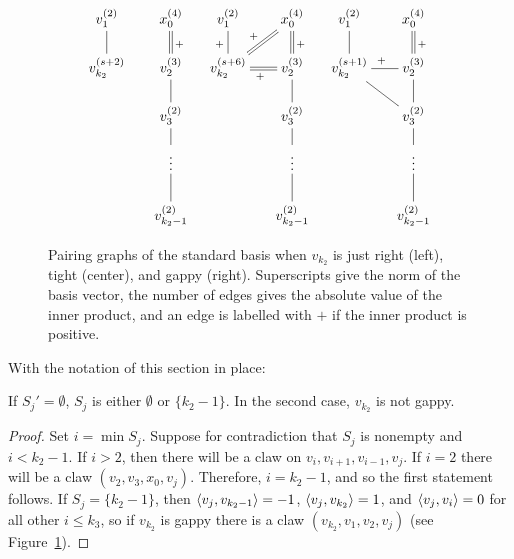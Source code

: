 \begin{figure}[t]
\centering
\begin{align*}
\xymatrix@R1.5em@C1.5em{
v_1^{(2)} \ar@{-}[d] & x_0^{(4)} \ar@{=}[d]^+ \\
v_{k_2}^{(s+2)} & v_2^{(3)} \ar@{-}[d] \\
 & v_{3}^{(2)} \ar@{-}[d] \\
 & \vdots \ar@{-}[d] \\
 & v_{k_2 - 1}^{(2)}
}
&&
\xymatrix@R1.5em@C1.5em{
v_1^{(2)} \ar@{-}[d]_+ & x_0^{(4)} \ar@{=}[d]^+ \ar@{=}[dl]_+\\
v_{k_2}^{(s+6)} \ar@{=}[r]_+ & v_2^{(3)} \ar@{-}[d] \\
 & v_{3}^{(2)} \ar@{-}[d] \\
 & \vdots \ar@{-}[d] \\
 & v_{k_2 - 1}^{(2)}
}
&&
\xymatrix@R1.5em@C1.5em{
v_1^{(2)} \ar@{-}[d] & x_0^{(4)} \ar@{=}[d]^+ \\
v_{k_2}^{(s+1)} \ar@{-}[r]^+ \ar@{-}[dr] & v_2^{(3)} \ar@{-}[d] \\
 & v_{3}^{(2)} \ar@{-}[d] \\
 & \vdots \ar@{-}[d] \\
 & v_{k_2 - 1}^{(2)}
}
\end{align*}
\caption{Pairing graphs of the standard basis when $v_{k_2}$ is just right (left), tight (center), and gappy (right). Superscripts give the norm of the basis vector, the number of edges gives the absolute value of the inner product, and an edge is labelled with $+$ if the inner product is positive. }\label{pairinggraphs}
\end{figure}

With the notation of this section in place:
\begin{lemma}\label{Sjempty}
If $S_j' = \emptyset$, $S_j$ is either $\emptyset$ or $\{k_2 - 1\}$. In the second case, $v_{k_2}$ is not gappy. 
\end{lemma}
\begin{proof}
Set $i = \min  S_j$. Suppose for contradiction that $S_j$ is nonempty and $i < k_2 - 1$. If $i > 2$,  then there will be a claw on $v_i, v_{i+1}, v_{i-1}, v_j$. If $i = 2$ there will be a claw $(v_2, v_3, x_0, v_j)$. Therefore, $i = k_2 - 1$, and so the first statement follows. If $S_j = \{k_2 - 1\}$, then $\left\langle v_j , v_{k_2 - 1} \right\rangle = -1$, $\left\langle v_j , v_{k_2} \right\rangle = 1$, and $\left\langle v_j , v_i \right\rangle = 0$ for all other $i \le k_3$, so if $v_{k_2}$ is gappy there is a claw $(v_{k_2}, v_1, v_2, v_j)$ (see Figure~\ref{pairinggraphs}).
\end{proof}

